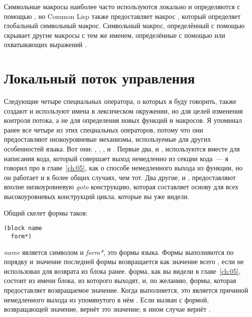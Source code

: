 Символьные макросы наиболее часто используются локально и определяются с помощью
, но Common Lisp также предоставляет макрос
, который определяет глобальный символьный макрос.  Символьный
макрос, определённый с помощью  скрывает другие макросы с тем же
именем, определённые с помощью  или охватывающих выражений
.

\section{Локальный поток управления}

Следующие четыре специальных оператора, о которых я буду говорить, также создают и
используют имена в лексическом окружении, но для целей изменения контроля потока, а не для
определения новых функций и макросов. Я упоминал ранее все четыре из этих специальных
операторов, потому что они предоставляют низкоуровневые механизмы, используемые для других
особенностей языка. Вот они: , , , и
. Первые два,  и , используются вместе для
написания кода, который совершает выход немедленно из секции кода~--- я говорил про
 в главе~\ref{ch:05}, как о способе немедленного выхода из функции, но
он работает и в более общих случаях, чем тот. Два другие,  и ,
предоставляют вполне низкоуровневую \textit{goto} конструкцию, которая составляет основу для всех
высокоуровневых конструкций цикла, которые вы уже видели.

Общий скелет формы  таков:

\begin{lstlisting}
(block name
  form*)
\end{lstlisting}

\textit{name} является символом и \textit{form*}, это формы языка. Формы выполняются по
порядку и значение последней формы возвращается как значение всего , если не
использован  для возврата из блока ранее.  форма, как
вы видели в главе~\ref{ch:05}, состоит из имени блока, из которого выходят, и, по желанию, формы,
которая предоставляет возвращаемое значение.  Когда  выполняется, это
является причиной немедленного выхода из упомянутого в нём .  Если
 вызван с формой, возвращающей значение,  вернёт это
значение; в ином случае  вернёт .

